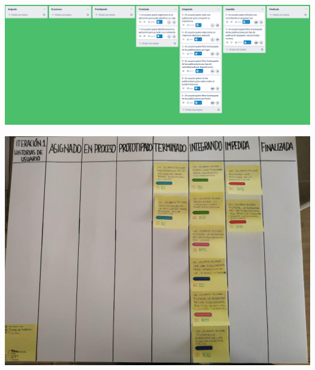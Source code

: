 \documentclass[spanish]{beamer}
\begin{document}
\begin{frame}
	\begin{center}
		\includegraphics[scale=0.25]{trello1_9}
	\end{center}
\end{frame}

\begin{frame}
	\begin{center}
		\includegraphics[angle=180, scale=0.33]{papel1_9}
	\end{center}
\end{frame}
\end{document}
